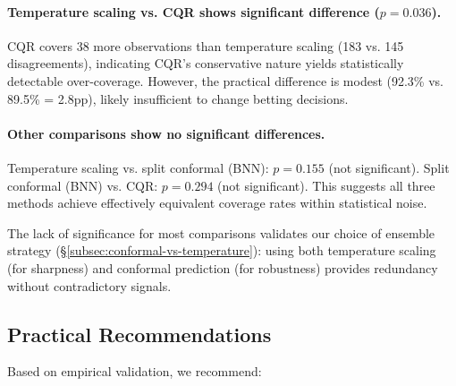 
\paragraph{Temperature scaling vs. CQR shows significant difference ($p=0.036$).}
CQR covers 38 more observations than temperature scaling (183 vs. 145 disagreements), indicating CQR's conservative nature yields statistically detectable over-coverage. However, the practical difference is modest (92.3\% vs. 89.5\% = 2.8pp), likely insufficient to change betting decisions.

\paragraph{Other comparisons show no significant differences.}
Temperature scaling vs. split conformal (BNN): $p=0.155$ (not significant). Split conformal (BNN) vs. CQR: $p=0.294$ (not significant). This suggests all three methods achieve effectively equivalent coverage rates within statistical noise.

The lack of significance for most comparisons validates our choice of ensemble strategy (\S\ref{subsec:conformal-vs-temperature}): using both temperature scaling (for sharpness) and conformal prediction (for robustness) provides redundancy without contradictory signals.

\subsection{Practical Recommendations}\label{subsec:conformal-recommendations}

Based on empirical validation, we recommend:

